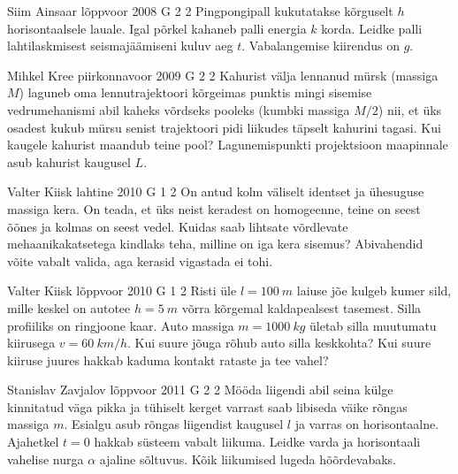 \documentclass[11pt]{article}
\begin{document}
{%
{Siim Ainsaar} %
{lõppvoor} %
{2008} %
{G 2} %
{2} %
{
\ifStatement
Pingpongipall kukutatakse kõrguselt $h$ horisontaalsele lauale. Igal põrkel kahaneb palli energia $k$ korda. Leidke palli lahtilaskmisest seismajäämiseni kuluv aeg $t$. Vabalangemise kiirendus on $g$.
\fi
}

{Mihkel Kree} %
{piirkonnavoor} %
{2009} %
{G 2} %
{2} %
{
\ifStatement
Kahurist välja lennanud mürsk (massiga $M$) laguneb oma lennutrajektoori kõrgeimas punktis mingi sisemise vedrumehanismi abil kaheks võrdseks pooleks (kumbki massiga $M/2$) nii, et üks osadest kukub mürsu senist trajektoori pidi liikudes täpselt kahurini tagasi. Kui kaugele kahurist maandub teine pool? Lagunemispunkti projektsioon maapinnale asub kahurist kaugusel $L$.
\fi
}

{Valter Kiisk} %
{lahtine} %
{2010} %
{G 1} %
{2} %
{
\ifStatement
On antud kolm väliselt identset ja ühesuguse massiga kera. On teada, et üks
neist keradest on homogeenne, teine on seest õõnes ja kolmas on seest vedel.
Kuidas saab lihtsate võrdlevate mehaanikakatsetega kindlaks teha, milline on iga
kera sisemus? Abivahendid võite vabalt valida, aga kerasid vigastada ei tohi.
\fi
}

{Valter Kiisk} %
{lõppvoor} %
{2010} %
{G 1} %
{2} %
{
\ifStatement
Risti üle $l=\SI{100}{m}$ laiuse jõe kulgeb kumer sild, mille keskel on
autotee $h=\SI{5}{m}$ võrra kõrgemal kaldapealsest tasemest. Silla profiiliks on
ringjoone kaar. Auto massiga $m=\SI{1000}{kg}$ ületab silla muutumatu kiirusega $v=\SI{60}{km/h}$.
Kui suure jõuga rõhub auto silla keskkohta? Kui suure kiiruse juures hakkab kaduma
kontakt rataste ja tee vahel?
\fi
}

{Stanislav Zavjalov} %
{lõppvoor} %
{2011} %
{G 2} %
{2} %
{
\ifStatement
Mööda liigendi abil seina külge kinnitatud väga pikka ja tühiselt
kerget varrast saab libiseda väike rõngas massiga $m$. Esialgu asub rõngas liigendist kaugusel $l$ ja varras on horisontaalne. Ajahetkel $t = \num{0}$ hakkab süsteem
vabalt liikuma. Leidke varda ja horisontaali vahelise nurga $\alpha$ ajaline sõltuvus.
Kõik liikumised lugeda hõõrdevabaks. 
\fi
}

}
\end{document}

